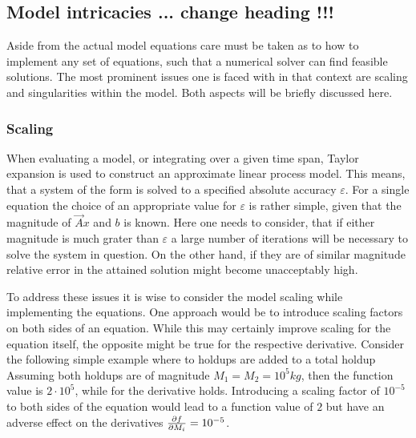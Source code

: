     \subsection{Model intricacies ... change heading !!!}
    Aside from the actual model equations care must be taken as to how to implement any set of equations,
    such that a numerical solver can find feasible solutions. The most prominent issues one is faced with in
    that context are scaling and singularities within the model. Both aspects will be briefly discussed here.

        \subsubsection{Scaling}
        When evaluating a model, or integrating over a given time span, Taylor expansion is used to construct
        an approximate linear process model. This means, that a system of the form
        is solved to a specified absolute accuracy $\varepsilon$. For a single equation the choice of an appropriate
        value for $\varepsilon$ is rather simple, given that the magnitude of $\vec{A} x$ and $b$ is known.
        Here one needs to consider, that if either magnitude is much grater than $\varepsilon$ a large number
        of iterations will be necessary to solve the system in question. On the other hand, if they are of similar
        magnitude relative error in the attained solution might become unacceptably high.

        To address these issues it is wise to consider the model scaling while implementing the equations.
        One approach would be to introduce scaling factors on both sides of an equation. While this
        may certainly improve scaling for the equation itself, the opposite might be true for the respective derivative.
        Consider the following simple example \cite{MarkPinto.2008} where to holdups are added to a total holdup
        Assuming both holdups are of magnitude $M_1 = M_2 = 10^5kg$, then the function value is $2 \cdot 10^5$, while for
        the derivative
        holds. Introducing a scaling factor of $10^{-5}$ to both sides of the equation would lead to a function value
        of $2$ but have an adverse effect on the derivatives $\frac{\partial f}{\partial M_i} = 10^{-5}$.

